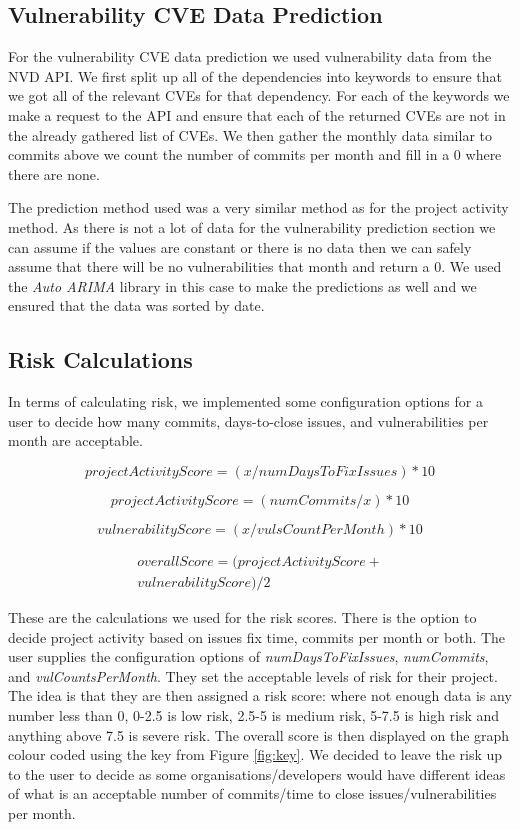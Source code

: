 \documentclass[conference]{IEEEtran}
\begin{document}
\subsection{Vulnerability CVE Data Prediction}
For the vulnerability CVE data prediction we used vulnerability data from the NVD API. We first split up all of the dependencies into keywords to ensure that we got all of the relevant CVEs for that dependency. For each of the keywords we make a request to the API and ensure that each of the returned CVEs are not in the already gathered list of CVEs. We then gather the monthly data similar to commits above we count the number of commits per month and fill in a 0 where there are none. 

The prediction method used was a very similar method as for the project activity method. As there is not a lot of data for the vulnerability prediction section we can assume if the values are constant or there is no data then we can safely assume that there will be no vulnerabilities that month and return a 0. We used the \textit{Auto ARIMA} library in this case to make the predictions as well and we ensured that the data was sorted by date. 


\subsection{Risk Calculations}
In terms of calculating risk, we implemented some configuration options for a user to decide how many commits, days-to-close issues, and vulnerabilities per month are acceptable. 

\[ projectActivityScore = ( x / numDaysToFixIssues ) * 10\]

\[ projectActivityScore = ( numCommits / x ) * 10\]

\[vulnerabilityScore = ( x / vulsCountPerMonth ) * 10\]

\begin{multline*}
  overallScore = ( projectActivityScore +\\ vulnerabilityScore) / 2 
\end{multline*}

These are the calculations we used for the risk scores. There is the option to decide project activity based on issues fix time, commits per month or both. The user supplies the configuration options of \textit{numDaysToFixIssues}, \textit{numCommits}, and \textit{vulCountsPerMonth}. They set the acceptable levels of risk for their project. The idea is that they are then assigned a risk score: where not enough data is any number less than 0, 0-2.5 is low risk, 2.5-5 is medium risk, 5-7.5 is high risk and anything above 7.5 is severe risk. The overall score is then displayed on the graph colour coded using the key from Figure \ref{fig:key}. We decided to leave the risk up to the user to decide as some organisations/developers would have different ideas of what is an acceptable number of commits/time to close issues/vulnerabilities per month. 
\end{document}
